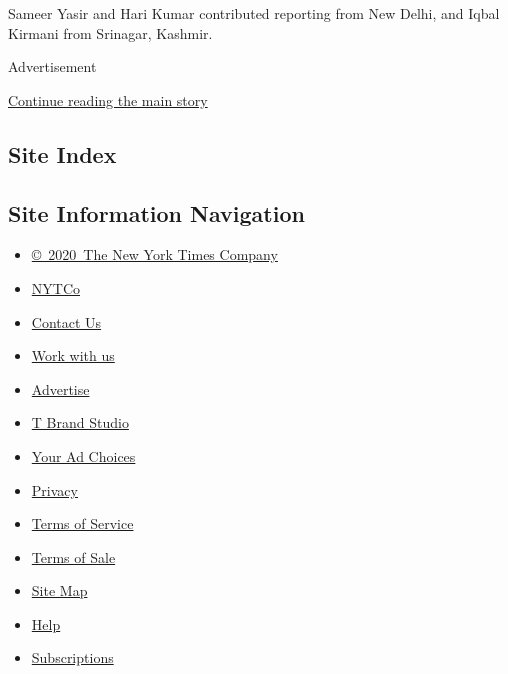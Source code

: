 Sameer Yasir and Hari Kumar contributed reporting from New Delhi, and
Iqbal Kirmani from Srinagar, Kashmir.

Advertisement

\protect\hyperlink{after-bottom}{Continue reading the main story}

\hypertarget{site-index}{%
\subsection{Site Index}\label{site-index}}

\hypertarget{site-information-navigation}{%
\subsection{Site Information
Navigation}\label{site-information-navigation}}

\begin{itemize}
\tightlist
\item
  \href{https://help.nytimes.com/hc/en-us/articles/115014792127-Copyright-notice}{©~2020~The
  New York Times Company}
\end{itemize}

\begin{itemize}
\tightlist
\item
  \href{https://www.nytco.com/}{NYTCo}
\item
  \href{https://help.nytimes.com/hc/en-us/articles/115015385887-Contact-Us}{Contact
  Us}
\item
  \href{https://www.nytco.com/careers/}{Work with us}
\item
  \href{https://nytmediakit.com/}{Advertise}
\item
  \href{http://www.tbrandstudio.com/}{T Brand Studio}
\item
  \href{https://www.nytimes.com/privacy/cookie-policy\#how-do-i-manage-trackers}{Your
  Ad Choices}
\item
  \href{https://www.nytimes.com/privacy}{Privacy}
\item
  \href{https://help.nytimes.com/hc/en-us/articles/115014893428-Terms-of-service}{Terms
  of Service}
\item
  \href{https://help.nytimes.com/hc/en-us/articles/115014893968-Terms-of-sale}{Terms
  of Sale}
\item
  \href{https://spiderbites.nytimes.com}{Site Map}
\item
  \href{https://help.nytimes.com/hc/en-us}{Help}
\item
  \href{https://www.nytimes.com/subscription?campaignId=37WXW}{Subscriptions}
\end{itemize}
